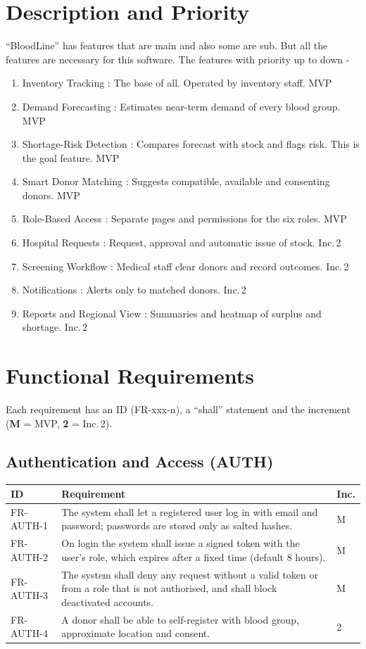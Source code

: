 \documentclass{scrreprt}
\begin{document}
\section{Description and Priority}
``BloodLine'' has features that are main and also some are sub. But all the features are necessary for this software.
\newline
The features with priority up to down -
\begin{enumerate}
    \item Inventory Tracking : The base of all. Operated by inventory staff. \hfill MVP
    \item Demand Forecasting : Estimates near-term demand of every blood group. \hfill MVP
    \item Shortage-Risk Detection : Compares forecast with stock and flags risk. This is the goal feature. \hfill MVP
    \item Smart Donor Matching : Suggests compatible, available and consenting donors. \hfill MVP
    \item Role-Based Access : Separate pages and permissions for the six roles. \hfill MVP
    \item Hospital Requests : Request, approval and automatic issue of stock. \hfill Inc.\,2
    \item Screening Workflow : Medical staff clear donors and record outcomes. \hfill Inc.\,2
    \item Notifications : Alerts only to matched donors. \hfill Inc.\,2
    \item Reports and Regional View : Summaries and heatmap of surplus and shortage. \hfill Inc.\,2
\end{enumerate}

\section{Functional Requirements}
Each requirement has an ID (FR-xxx-n), a ``shall'' statement and the increment (\textbf{M} = MVP, \textbf{2} = Inc.\,2).

\subsection*{Authentication and Access (AUTH)}
\begin{longtable}{@{}l L{11.6cm} l@{}}
\toprule
\textbf{ID} & \textbf{Requirement} & \textbf{Inc.}\\
\midrule
\endhead
FR-AUTH-1 & The system shall let a registered user log in with email and password; passwords are stored only as salted hashes. & M\\
FR-AUTH-2 & On login the system shall issue a signed token with the user's role, which expires after a fixed time (default 8 hours). & M\\
FR-AUTH-3 & The system shall deny any request without a valid token or from a role that is not authorised, and shall block deactivated accounts. & M\\
FR-AUTH-4 & A donor shall be able to self-register with blood group, approximate location and consent. & 2\\
\bottomrule
\end{longtable}
\end{document}
